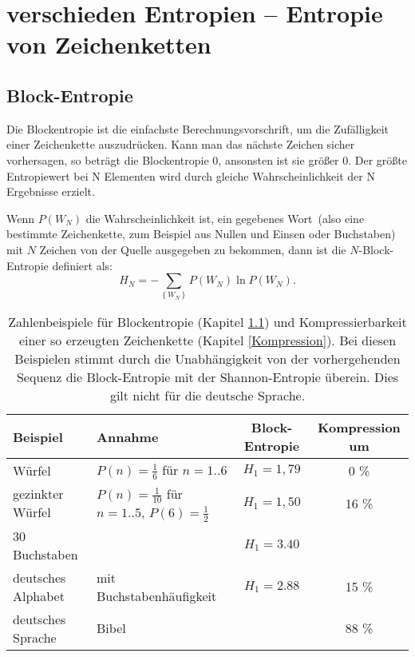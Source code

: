 \documentclass[a4paper]{scrartcl}
\begin{document}
\section{verschieden Entropien -- Entropie von Zeichenketten}
\subsection{Block-Entropie}
\label{Block-Entropie} %
Die Blockentropie ist die einfachste Berechnungsvorschrift, um die Zuf\"alligkeit einer Zeichenkette auszudr\"ucken. Kann man das n\"achste Zeichen sicher vorhersagen, so betr\"agt die Blockentropie 0, ansonsten ist sie gr\"o\ss{}er 0. Der gr\"o\ss{}te Entropiewert bei N Elementen wird durch gleiche Wahrscheinlichkeit der N Ergebnisse erzielt. 

Wenn $P\left( W_N \right)$ die Wahrscheinlichkeit ist, ein gegebenes \glqq Wort\grqq\ (also eine bestimmte Zeichenkette, zum Beispiel aus Nullen und Einsen oder Buchstaben) mit $N$ Zeichen von der Quelle ausgegeben zu bekommen, dann ist die $N$-Block-Entropie definiert als:
\[
  H_N = - \sum_{\left\{W_N\right\}} P\left(W_N\right) \ln P\left(W_N\right) \text{.}
\]

\begin{table}[hb]	%
\centering
\begin{tabular}{l|l|c||c} 
  Beispiel & Annahme & Block-Entropie & Kompression um\\
  \hline
  W\"urfel & $P\left( n \right) = \frac{1}{6}$ f\"ur $n=1..6$ & $H_1 = 1,79$ & 0 \% \\
  gezinkter W\"urfel & $P\left( n \right) = \frac{1}{10}$ f\"ur $n=1..5$, $P\left( 6 \right) = \frac{1}{2}$ & $H_1 = 1,50$ & 16 \% \\
  30 Buchstaben && $H_1 = 3.40$ & \\
  deutsches Alphabet & mit Buchstabenh\"aufigkeit & $H_1 = 2.88$ & 15 \% \\
  deutsches Sprache & Bibel & & 88 \% \\
\end{tabular}
\caption{Zahlenbeispiele f\"ur Blockentropie (Kapitel \ref{Block-Entropie}) und Kompressierbarkeit einer so erzeugten Zeichenkette (Kapitel \ref{Kompression}). Bei diesen Beispielen stimmt durch die Unabh\"angigkeit von der vorhergehenden Sequenz die Block-Entropie mit der Shannon-Entropie \"uberein. Dies gilt nicht f\"ur die deutsche Sprache.}
\end{table}
\end{document}
